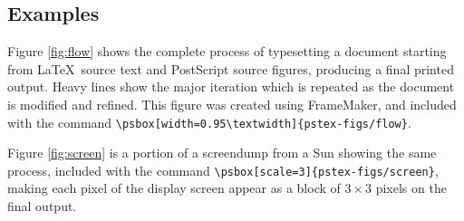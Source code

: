 \subsection{Examples}

Figure \ref{fig:flow} shows the complete process
of typesetting a document starting from
\LaTeX\ source text and PostScript source figures,
producing a final printed output.
Heavy lines show the major iteration which is repeated
as the document is modified and refined.
This figure was created using FrameMaker,
and included with the command
\verb|\psbox[width=0.95\textwidth]{pstex-figs/flow}|.

Figure \ref{fig:screen} is a portion of a screendump from a Sun
showing the same process,
included with the command \verb|\psbox[scale=3]{pstex-figs/screen}|,
making each pixel of the display screen appear
as a block of $3 \times 3$ pixels on
the final output.


